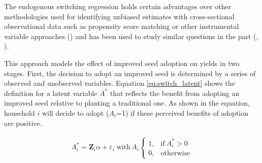 \documentclass[11pt]{article}
\begin{document}
The endogenous switching regression holds certain advantages over other methodologies used for identifying unbiased estimates with cross-sectional observational data such as propensity score matching or other instrumental variable approaches (\cite{Shiferaw2014-op}) and has been used to study similar questions in the past (\citealt{falco2011does}, \citealt{kabunga2012yield}). \par
This approach models the effect of improved seed adoption on yields in two stages. First, the decision to adopt an improved seed is determined by a series of observed and unobserved variables. Equation \ref{eq:switch_latent} shows the definition for a latent variable $A^*$ that reflects the benefit from adopting an improved seed relative to planting a traditional one. As shown in the equation, household $i$ will decide to adopt ($A_i$=1) if these perceived benefits of adoption are positive.

\begin{align}
A_i^*=\bm{Z}_i\alpha+\varepsilon_i \; \text{with} \, A_i    \begin{cases}
      1, & \text{if}\ A_i^*>0 \\
      0, & \text{otherwise}
    \end{cases} \label{eq:switch_latent}
\end{align}
\end{document}

